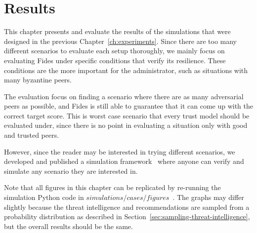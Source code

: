 \chapter{Results}
\label{ch:results}
This chapter presents and evaluate the results of the simulations that were designed in the previous Chapter~\ref{ch:experiments}. Since there are too many different scenarios to evaluate each setup thoroughly, we mainly focus on evaluating Fides under specific conditions that verify its resilience. These conditions are the more important for the administrator, such as situations with many byzantine peers.

The evaluation focus on finding a scenario where there are as many adversarial peers as possible, and Fides is still able to guarantee that it can come up with the correct target score. This is worst case scenario that every trust model should be evaluated under, since there is no point in evaluating a situation only with good and trusted peers.

However, since the reader may be interested in trying different scenarios, we developed and published a simulation framework~\cite{fidesGithub} where anyone can verify and simulate any scenario they are interested in.

Note that all figures in this chapter can be replicated by re-running the simulation Python code in $simulations/cases/figures$~\cite{fidesGithub}.
The graphs may differ slightly because the threat intelligence and recommendations are sampled from a probability distribution as described in Section~\ref{sec:sampling-threat-intelligence}, but the overall results should be the same.





